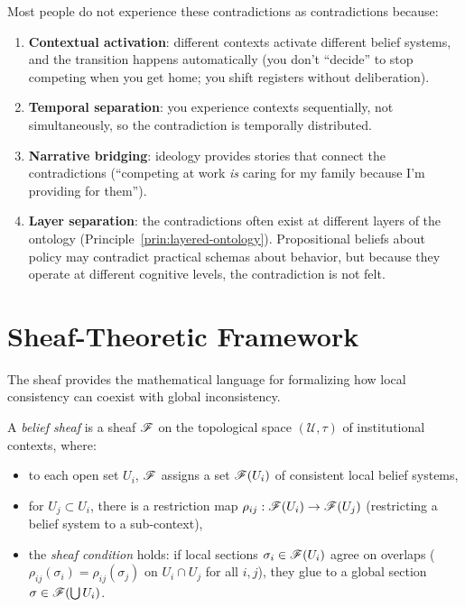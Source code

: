 \begin{remark}
\label{rem:not-noticed}
Most people do not experience these contradictions as contradictions because:
\begin{enumerate}[nosep]
  \item \textbf{Contextual activation}: different contexts activate different belief systems, and the transition happens automatically (you don't ``decide'' to stop competing when you get home; you shift registers without deliberation).
  \item \textbf{Temporal separation}: you experience contexts sequentially, not simultaneously, so the contradiction is temporally distributed.
  \item \textbf{Narrative bridging}: ideology provides stories that connect the contradictions (``competing at work \emph{is} caring for my family because I'm providing for them'').
  \item \textbf{Layer separation}: the contradictions often exist at different layers of the ontology (Principle~\ref{prin:layered-ontology}). Propositional beliefs about policy may contradict practical schemas about behavior, but because they operate at different cognitive levels, the contradiction is not felt.
\end{enumerate}
\end{remark}


\section{Sheaf-Theoretic Framework}
\label{sec:ch12-sheaf}

The sheaf provides the mathematical language for formalizing how local consistency can coexist with global inconsistency.

\begin{definition}
\label{def:belief-sheaf}
A \emph{belief sheaf} is a sheaf $\mathscr{F}$ on the topological space $(\mathcal{U}, \tau)$ of institutional contexts, where:
\begin{itemize}[nosep]
  \item to each open set $U_i$, $\mathscr{F}$ assigns a set $\mathscr{F}(U_i)$ of consistent local belief systems,
  \item for $U_j \subset U_i$, there is a restriction map $\rho_{ij}: \mathscr{F}(U_i) \to \mathscr{F}(U_j)$ (restricting a belief system to a sub-context),
  \item the \emph{sheaf condition} holds: if local sections $\sigma_i \in \mathscr{F}(U_i)$ agree on overlaps ($\rho_{ij}(\sigma_i) = \rho_{ij}(\sigma_j)$ on $U_i \cap U_j$ for all $i, j$), they glue to a global section $\sigma \in \mathscr{F}(\bigcup U_i)$.
\end{itemize}
\end{definition}

